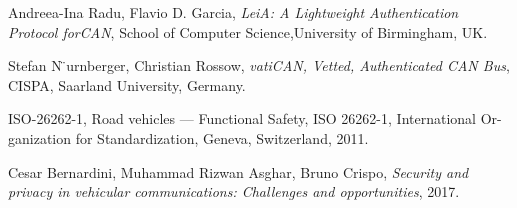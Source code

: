 \documentclass[11pt]{article}
\begin{document}
\begin{thebibliography}{10}
    Andreea-Ina Radu, Flavio D. Garcia,
    \textit{LeiA: A Lightweight Authentication Protocol forCAN},
    School of Computer Science,University of Birmingham, UK.
    
    Stefan N ̈urnberger, Christian Rossow,
    \textit{vatiCAN, Vetted, Authenticated CAN Bus},
	CISPA, Saarland University, Germany.
	
	ISO-26262-1, Road vehicles — Functional Safety, ISO 26262-1, International Or- ganization for Standardization, Geneva, Switzerland, 2011.
	
	Cesar Bernardini, Muhammad Rizwan Asghar, Bruno Crispo,
	\textit{Security and privacy in vehicular communications: Challenges and opportunities}, 2017.

	
\end{thebibliography}
\end{document}
